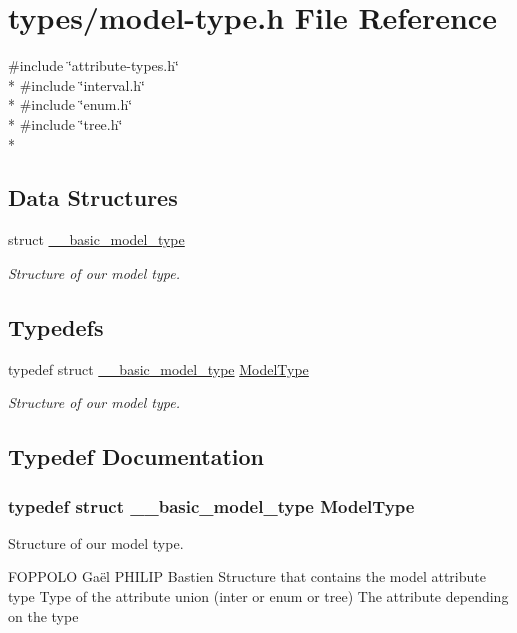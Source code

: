 \hypertarget{model-type_8h}{}\section{types/model-\/type.h File Reference}
\label{model-type_8h}
{\ttfamily \#include \char`\"{}attribute-\/types.\+h\char`\"{}}\\*
{\ttfamily \#include \char`\"{}interval.\+h\char`\"{}}\\*
{\ttfamily \#include \char`\"{}enum.\+h\char`\"{}}\\*
{\ttfamily \#include \char`\"{}tree.\+h\char`\"{}}\\*
\subsection*{Data Structures}
\begin{DoxyCompactItemize}
\item 
struct \hyperlink{struct____basic__model__type}{\+\_\+\+\_\+basic\+\_\+model\+\_\+type}
\begin{DoxyCompactList}\small\item\em Structure of our model type. \end{DoxyCompactList}\end{DoxyCompactItemize}
\subsection*{Typedefs}
\begin{DoxyCompactItemize}
\item 
typedef struct \hyperlink{struct____basic__model__type}{\+\_\+\+\_\+basic\+\_\+model\+\_\+type} \hyperlink{model-type_8h_af790f1d394efe2e637644629b49a8c65}{Model\+Type}
\begin{DoxyCompactList}\small\item\em Structure of our model type. \end{DoxyCompactList}\end{DoxyCompactItemize}


\subsection{Typedef Documentation}
\subsubsection[{\texorpdfstring{Model\+Type}{ModelType}}]{\setlength{\rightskip}{0pt plus 5cm}typedef struct {\bf \+\_\+\+\_\+basic\+\_\+model\+\_\+type}  {\bf Model\+Type}}\hypertarget{model-type_8h_af790f1d394efe2e637644629b49a8c65}{}\label{model-type_8h_af790f1d394efe2e637644629b49a8c65}


Structure of our model type. 

F\+O\+P\+P\+O\+LO Gaël  P\+H\+I\+L\+IP Bastien Structure that contains the model attribute  type Type of the attribute  union (inter or enum or tree) The attribute depending on the type 